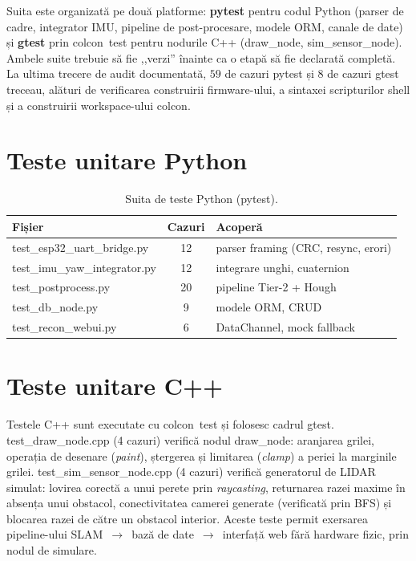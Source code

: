 \documentclass[a4paper,12pt,twoside,openany]{report}
\renewcommand{\texttt}[1]{\textnormal{#1}}
\begin{document}
Suita este organizată pe două platforme: \textbf{pytest} pentru codul
Python (parser de cadre, integrator IMU, pipeline de post-procesare, modele
ORM, canale de date) și \textbf{gtest} prin \texttt{colcon~test} pentru
nodurile C++ (\texttt{draw\_node}, \texttt{sim\_sensor\_node}). Ambele suite
trebuie să fie ,,verzi'' înainte ca o etapă să fie declarată completă. La
ultima trecere de audit documentată, $59$ de cazuri pytest și $8$ de cazuri
gtest treceau, alături de verificarea construirii firmware-ului, a sintaxei
scripturilor shell și a construirii workspace-ului colcon.

\section{Teste unitare Python}
\label{sec:test-python}

\begin{table}[H]
\centering
\caption{Suita de teste Python (pytest).}
\label{tab:test-python}
\begin{tabular}{lcl}
\toprule
\textbf{Fișier} & \textbf{Cazuri} & \textbf{Acoperă} \\
\midrule
\texttt{test\_esp32\_uart\_bridge.py}   & 12 & parser framing (CRC, resync, erori) \\
\texttt{test\_imu\_yaw\_integrator.py}  & 12 & integrare unghi, cuaternion \\
\texttt{test\_postprocess.py}           & 20 & pipeline Tier-2 + Hough \\
\texttt{test\_db\_node.py}              & 9  & modele ORM, CRUD \\
\texttt{test\_recon\_webui.py}          & 6  & DataChannel, mock fallback \\
\bottomrule
\end{tabular}
\end{table}

\section{Teste unitare C++}
\label{sec:test-cpp}

Testele C++ sunt executate cu \texttt{colcon~test} și folosesc cadrul
gtest. \texttt{test\_draw\_node.cpp} (4 cazuri) verifică nodul
\texttt{draw\_node}: aranjarea grilei, operația de desenare (\textit{paint}),
ștergerea și limitarea (\textit{clamp}) a periei la marginile grilei.
\texttt{test\_sim\_sensor\_node.cpp} (4 cazuri) verifică generatorul de
LIDAR simulat: lovirea corectă a unui perete prin \textit{raycasting},
returnarea razei maxime în absența unui obstacol, conectivitatea camerei
generate (verificată prin BFS) și blocarea razei de către un obstacol
interior. Aceste teste permit exersarea pipeline-ului SLAM~$\to$~bază de
date~$\to$~interfață web fără hardware fizic, prin nodul de simulare.
\end{document}
